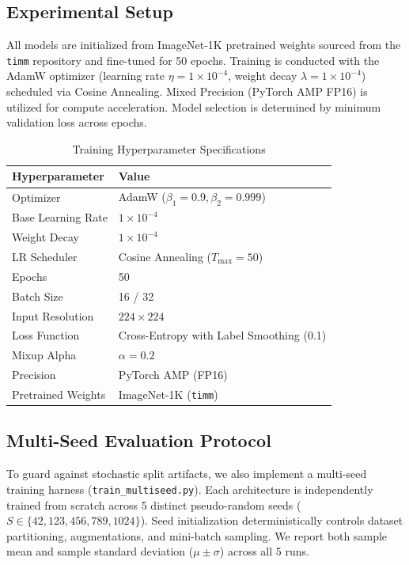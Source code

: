 \documentclass[conference]{IEEEtran}
\begin{document}
\subsection{Experimental Setup}
All models are initialized from ImageNet-1K pretrained weights sourced from the \texttt{timm} repository and fine-tuned for 50 epochs. Training is conducted with the AdamW optimizer (learning rate $\eta = 1 \times 10^{-4}$, weight decay $\lambda = 1 \times 10^{-4}$) scheduled via Cosine Annealing. Mixed Precision (PyTorch AMP FP16) is utilized for compute acceleration. Model selection is determined by minimum validation loss across epochs.

\begin{table}[htbp]
\caption{Training Hyperparameter Specifications}
\label{tab:hyperparams}
\begin{center}
\begin{tabular}{ll}
\toprule
\textbf{Hyperparameter} & \textbf{Value} \\
\midrule
Optimizer & AdamW ($\beta_1=0.9, \beta_2=0.999$) \\
Base Learning Rate & $1 \times 10^{-4}$ \\
Weight Decay & $1 \times 10^{-4}$ \\
LR Scheduler & Cosine Annealing ($T_{\max}=50$) \\
Epochs & 50 \\
Batch Size & 16 / 32 \\
Input Resolution & $224 \times 224$ \\
Loss Function & Cross-Entropy with Label Smoothing (0.1) \\
Mixup Alpha & $\alpha = 0.2$ \\
Precision & PyTorch AMP (FP16) \\
Pretrained Weights & ImageNet-1K (\texttt{timm}) \\
\bottomrule
\end{tabular}
\end{center}
\end{table}

\subsection{Multi-Seed Evaluation Protocol}
To guard against stochastic split artifacts, we also implement a multi-seed training harness (\texttt{train\_multiseed.py}). Each architecture is independently trained from scratch across 5 distinct pseudo-random seeds ($S \in \{42, 123, 456, 789, 1024\}$). Seed initialization deterministically controls dataset partitioning, augmentations, and mini-batch sampling. We report both sample mean and sample standard deviation ($\mu \pm \sigma$) across all 5 runs.
\end{document}
